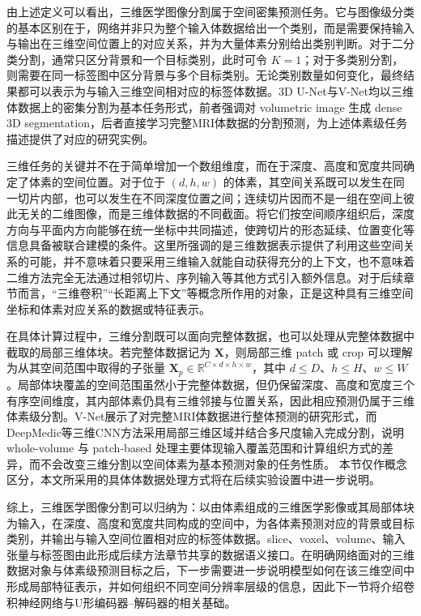 由上述定义可以看出，三维医学图像分割属于空间密集预测任务。它与图像级分类的基本区别在于，网络并非只为整个输入体数据给出一个类别，而是需要保持输入与输出在三维空间位置上的对应关系，并为大量体素分别给出类别判断。对于二分类分割，通常只区分背景和一个目标类别，此时可令 \(K=1\)；对于多类别分割，则需要在同一标签图中区分背景与多个目标类别。无论类别数量如何变化，最终结果都可以表示为与输入三维空间相对应的标签体数据。3D U-Net与V-Net均以三维体数据上的密集分割为基本任务形式，前者强调对 volumetric image 生成 dense 3D segmentation，后者直接学习完整MRI体数据的分割预测，为上述体素级任务描述提供了对应的研究实例。\cite{cicek2016threeDunet,milletari2016vnet}

三维任务的关键并不在于简单增加一个数组维度，而在于深度、高度和宽度共同确定了体素的空间位置。对于位于 \((d,h,w)\) 的体素，其空间关系既可以发生在同一切片内部，也可以发生在不同深度位置之间；连续切片因而不是一组在空间上彼此无关的二维图像，而是三维体数据的不同截面。将它们按空间顺序组织后，深度方向与平面内方向能够在统一坐标中共同描述，使跨切片的形态延续、位置变化等信息具备被联合建模的条件。\cite{cicek2016threeDunet,milletari2016vnet}这里所强调的是三维数据表示提供了利用这些空间关系的可能，并不意味着只要采用三维输入就能自动获得充分的上下文，也不意味着二维方法完全无法通过相邻切片、序列输入等其他方式引入额外信息。对于后续章节而言，“三维卷积”“长距离上下文”等概念所作用的对象，正是这种具有三维空间坐标和体素对应关系的数据或特征表示。

在具体计算过程中，三维分割既可以面向完整体数据，也可以处理从完整体数据中截取的局部三维体块。若完整体数据记为 \(\mathbf{X}\)，则局部三维 patch 或 crop 可以理解为从其空间范围中取得的子张量 \(\mathbf{X}_{p}\in\mathbb{R}^{C\times d\times h\times w}\)，其中 \(d\leq D\)、\(h\leq H\)、\(w\leq W\)。局部体块覆盖的空间范围虽然小于完整体数据，但仍保留深度、高度和宽度三个有序空间维度，其内部体素仍具有三维邻接与位置关系，因此相应预测仍属于三维体素级分割。V-Net展示了对完整MRI体数据进行整体预测的研究形式，而DeepMedic等三维CNN方法采用局部三维区域并结合多尺度输入完成分割，说明 whole-volume 与 patch-based 处理主要体现输入覆盖范围和计算组织方式的差异，而不会改变三维分割以空间体素为基本预测对象的任务性质。\cite{milletari2016vnet,kamnitsas2017deepmedic} 本节仅作概念区分，本文所采用的具体体数据处理方式将在后续实验设置中进一步说明。

综上，三维医学图像分割可以归纳为：以由体素组成的三维医学影像或其局部体块为输入，在深度、高度和宽度共同构成的空间中，为各体素预测对应的背景或目标类别，并输出与输入空间位置相对应的标签体数据。slice、voxel、volume、输入张量与标签图由此形成后续方法章节共享的数据语义接口。在明确网络面对的三维数据对象与体素级预测目标之后，下一步需要进一步说明模型如何在该三维空间中形成局部特征表示，并如何组织不同空间分辨率层级的信息，因此下一节将介绍卷积神经网络与U形编码器--解码器的相关基础。

